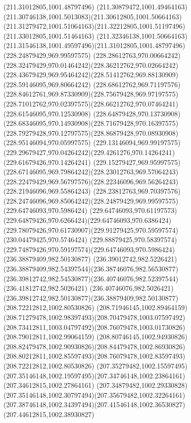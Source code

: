 {{	\moveto(211.31012805,1001.48797496)
	\curveto(211.30879472,1001.49464163)(211.30746138,1001.5013083)(211.30612805,1001.50664163)
	\curveto(211.31279472,1001.51064163)(211.32212805,1001.51197496)(211.33012805,1001.51464163)
	\curveto(211.32346138,1001.50664163)(211.31546138,1001.49597496)(211.31012805,1001.48797496)
	\moveto(228.24879429,969.99597575)
	\curveto(228.28612763,970.00664242)(228.32479429,970.01464242)(228.36212762,970.02664242)
	\curveto(228.43679429,969.95464242)(228.51412762,969.88130909)(228.59146095,969.80664242)
	\curveto(228.68612762,969.71197576)(228.84612761,969.87330909)(228.75679428,969.97197575)
	\curveto(228.71012762,970.02397575)(228.66212762,970.07464241)(228.61546095,970.12530908)
	\curveto(228.64879428,970.13730908)(228.68346095,970.14930908)(228.71679428,970.16397575)
	\curveto(228.79279428,970.12797575)(228.86879428,970.08930908)(228.95146094,970.05997575)
	\curveto(229.13146094,969.99197575)(229.29679427,970.04264242)(229.4261276,970.14264241)
	\lineto(229.61679426,970.14264241)
	\curveto(229.15279427,969.95997575)(228.67146095,969.79864242)(228.23012763,969.57064243)
	\curveto(228.22479429,969.56797576)(228.22346096,969.56264243)(228.21946096,969.55864243)
	\curveto(228.23812763,969.70397576)(228.24746096,969.85064242)(228.24879429,969.99597575)
	\moveto(229.64746093,970.5986424)
	\curveto(229.64746093,970.61197573)(229.64879426,970.6266424)(229.64746093,970.6386424)
	\curveto(229.78079426,970.61730907)(229.91279425,970.59597574)(230.04479425,970.5746424)
	\curveto(229.88879425,970.58397574)(229.74879426,970.59197574)(229.64746093,970.5986424)
	\moveto(236.38879409,982.50130877)
	\curveto(236.39012742,982.5226421)(236.38879409,982.54397544)(236.38746076,982.56530877)
	\curveto(236.39812742,982.54530877)(236.40746076,982.52397544)(236.41812742,982.5026421)
	\curveto(236.40746076,982.5026421)(236.39812742,982.50130877)(236.38879409,982.50130877)
	\moveto(208.72212812,1002.80530826)
	\curveto(208.71946145,1002.89464159)(208.71279478,1002.98397493)(208.70479478,1003.07597492)
	\curveto(208.73412811,1003.04797492)(208.76079478,1003.01730826)(208.79012811,1002.99064159)
	\curveto(208.80746145,1002.94930826)(208.82479478,1002.90930826)(208.84479478,1002.86930826)
	\curveto(208.80212811,1002.85597493)(208.76079478,1002.83597493)(208.72212812,1002.80530826)
	\moveto(207.35279482,1002.15597495)
	\curveto(207.35146148,1002.19597495)(207.34746148,1002.23864161)(207.34612815,1002.27864161)
	\curveto(207.34879482,1002.29330828)(207.35146148,1002.30797494)(207.35679482,1002.32264161)
	\curveto(207.38746148,1002.34397494)(207.41546148,1002.36530827)(207.44612815,1002.38930827)
}}
